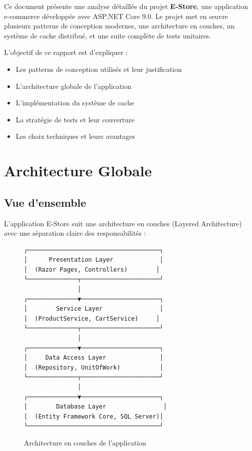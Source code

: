 \documentclass[12pt,a4paper]{article}
\begin{document}
Ce document présente une analyse détaillée du projet \textbf{E-Store}, une application e-commerce développée avec ASP.NET Core 9.0. Le projet met en œuvre plusieurs patterns de conception modernes, une architecture en couches, un système de cache distribué, et une suite complète de tests unitaires.

L'objectif de ce rapport est d'expliquer :
\begin{itemize}
    \item Les patterns de conception utilisés et leur justification
    \item L'architecture globale de l'application
    \item L'implémentation du système de cache
    \item La stratégie de tests et leur couverture
    \item Les choix techniques et leurs avantages
\end{itemize}

\section{Architecture Globale}

\subsection{Vue d'ensemble}

L'application E-Store suit une architecture en couches (Layered Architecture) avec une séparation claire des responsabilités :

\begin{figure}[H]
\centering
\begin{verbatim}
┌─────────────────────────────────────┐
│      Presentation Layer             │
│  (Razor Pages, Controllers)        │
└──────────────┬──────────────────────┘
               │
┌──────────────▼──────────────────────┐
│        Service Layer                │
│  (ProductService, CartService)     │
└──────────────┬──────────────────────┘
               │
┌──────────────▼──────────────────────┐
│     Data Access Layer               │
│  (Repository, UnitOfWork)           │
└──────────────┬──────────────────────┘
               │
┌──────────────▼──────────────────────┐
│        Database Layer                │
│  (Entity Framework Core, SQL Server)│
└─────────────────────────────────────┘
\end{verbatim}
\caption{Architecture en couches de l'application}
\end{figure}
\end{document}
